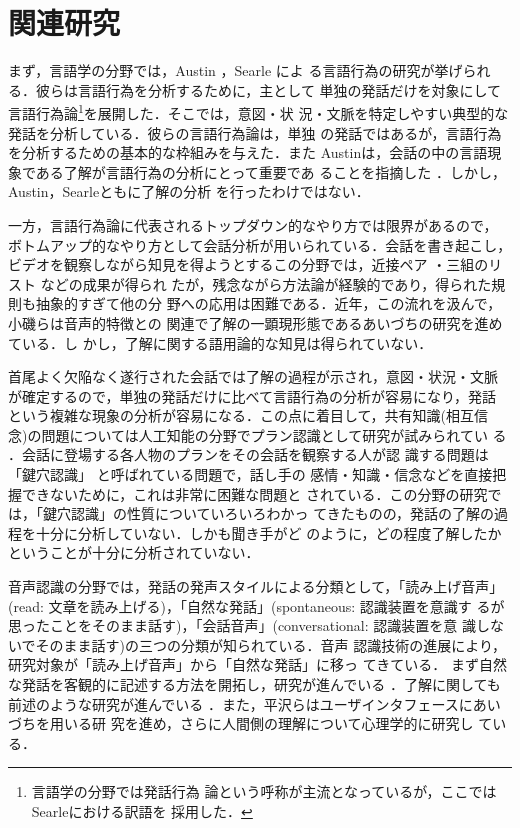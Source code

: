 \section{関連研究}


まず，言語学の分野では，Austin\cite{austin} ，Searle\cite{searle} によ
る言語行為の研究が挙げられる．彼らは言語行為を分析するために，主として
単独の発話だけを対象にして言語行為論\footnote{言語学の分野では発話行為
論という呼称が主流となっているが，ここではSearle\cite{searle}における訳語を
採用した．}を展開した．そこでは，意図・状
況・文脈を特定しやすい典型的な発話を分析している．彼らの言語行為論は，単独
の発話ではあるが，言語行為を分析するための基本的な枠組みを与えた．また
Austinは，会話の中の言語現象である了解が言語行為の分析にとって重要であ
ることを指摘した\cite{austin} ．しかし，Austin，Searleともに了解の分析
を行ったわけではない．


一方，言語行為論に代表されるトップダウン的なやり方では限界があるので，
ボトムアップ的なやり方として会話分析が用いられている．会話を書き起こし，
ビデオを観察しながら知見を得ようとするこの分野では，近接ペア
\cite{levinson83a} ・三組のリスト\cite{levinson83a} などの成果が得られ
たが，残念ながら方法論が経験的であり，得られた規則も抽象的すぎて他の分
野への応用は困難である．近年，この流れを汲んで，小磯らは音声的特徴との
関連で了解の一顕現形態であるあいづちの研究を進めている\cite{koiso}．し
かし，了解に関する語用論的な知見は得られていない．

首尾よく欠陥なく遂行された会話では了解の過程が示され，意図・状況・文脈
が確定するので，単独の発話だけに比べて言語行為の分析が容易になり，発話
という複雑な現象の分析が容易になる．この点に着目して，共有知識(相互信
念)の問題については人工知能の分野でプラン認識として研究が試みられてい
る\cite{kato} ．会話に登場する各人物のプランをその会話を観察する人が認
識する問題は「鍵穴認識」\cite{suchman} と呼ばれている問題で，話し手の
感情・知識・信念などを直接把握できないために，これは非常に困難な問題と
されている．この分野の研究では，「鍵穴認識」の性質についていろいろわかっ
てきたものの，発話の了解の過程を十分に分析していない．しかも聞き手がど
のように，どの程度了解したかということが十分に分析されていない．

音声認識の分野では，発話の発声スタイルによる分類として，「読み上げ音声」
(read: 文章を読み上げる)，「自然な発話」(spontaneous: 認識装置を意識す
るが思ったことをそのまま話す)，「会話音声」(conversational: 認識装置を意
識しないでそのまま話す)の三つの分類が知られている\cite{kawahara}．音声
認識技術の進展により，研究対象が「読み上げ音声」から「自然な発話」に移っ
てきている\cite{okada}．
まず自然な発話を客観的に記述する方法を開拓し，研究が進んでいる
\cite{shimazu92a} ．了解に関しても前述のような研究が進んでいる
\cite{shimazu}．また，平沢らはユーザインタフェースにあいづちを用いる研
究を進め\cite{hirasawa99}，さらに人間側の理解について心理学的に研究し
ている\cite{hirasawa00}．

